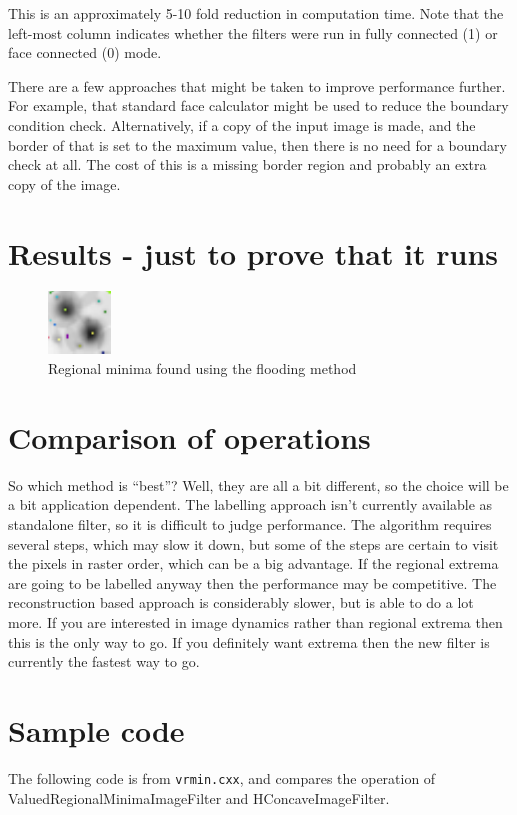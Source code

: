 \documentclass{llncs}
\begin{document}
This is an approximately 5-10 fold reduction in computation time. Note
that the left-most column indicates whether the filters were run in
fully connected (1) or face connected (0) mode.

There are a few approaches that might be taken to improve performance
further. For example, that standard face calculator might be used to
reduce the boundary condition check. Alternatively, if a copy of the
input image is made, and the border of that is set to the maximum
value, then there is no need for a boundary check at all. The cost of
this is a missing border region and probably an extra copy of the
image.

\section{Results - just to prove that it runs}
\begin{figure}[htbp]
\begin{center}
\includegraphics[scale=3]{reg_min_ov}
\caption{Regional minima found using the flooding method}
\end{center}
\end{figure}


\section{Comparison of operations}
So which method is ``best''? Well, they are all a bit different, so
the choice will be a bit application dependent. The labelling approach
isn't currently available as standalone filter, so it is difficult to
judge performance. The algorithm requires several steps, which may
slow it down, but some of the steps are certain to visit the pixels in
raster order, which can be a big advantage. If the regional extrema
are going to be labelled anyway then the performance may be
competitive. The reconstruction based approach is considerably slower,
but is able to do a lot more. If you are interested in image dynamics
rather than regional extrema then this is the only way to go. If you
definitely want extrema then the new filter is currently the fastest
way to go.

\section{Sample code}
The following code is from {\tt vrmin.cxx}, and compares the operation
of ValuedRegionalMinimaImageFilter and HConcaveImageFilter.
\end{document}
